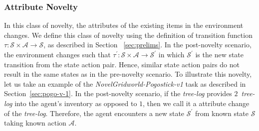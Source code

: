 \documentclass[sigconf]{aamas}
\begin{document}
\subsubsection{Attribute Novelty}
In this class of novelty, the attributes of the existing items in the environment changes. We define this class of novelty using the definition of transition function $\mathcal{\tau}: \mathcal{S} \times \mathcal{A} \rightarrow \mathcal{S}$, as described in Section ~\ref{sec:prelims}. In the post-novelty scenario, the environment changes such that $\mathcal{\tau^{\prime}}: \mathcal{S} \times \mathcal{A} \rightarrow \mathcal{S^{\prime}}$ in which $\mathcal{S^{\prime}}$ is the new state transition from the state action pair. Hence, similar state action pairs do not result in the same states as in the pre-novelty scenario. To illustrate this novelty, let us take an example of the \emph{NovelGridworld-Pogostick-v1} task as described in Section~\ref{sec:pogo-v-1}. In the post-novelty scenario, if the \emph{tree-log} provides $2$~\emph{tree-log} into the agent's inventory as opposed to $1$, then we call it a attribute change of the \emph{tree-log}. Therefore, the agent encounters a new state $\mathcal{S^{\prime}}$ from known state $\mathcal{S}$ taking known action $\mathcal{A}$.
\end{document}
